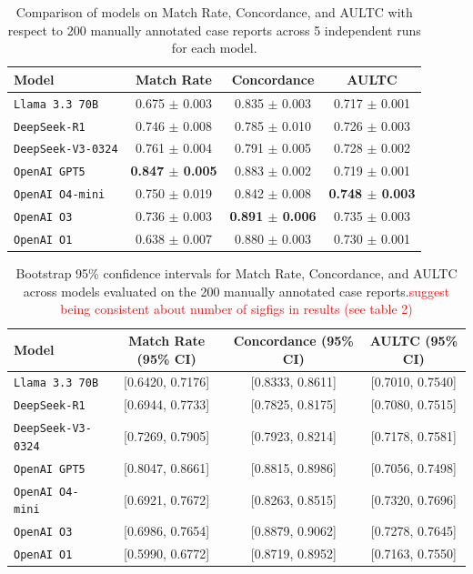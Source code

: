 \documentclass[pdflatex,sn-mathphys-num]{sn-jnl}%
\newcommand{\jeremy}[1]{\textcolor{red}{#1}}
\theoremstyle{thmstyleone}%
\theoremstyle{thmstyletwo}%
\theoremstyle{thmstylethree}%
\begin{document}
\begin{table}[h!]
\vspace{-5mm}
\centering
\caption{Comparison of models on Match Rate, Concordance, and AULTC with respect to 200 manually annotated case reports across 5 independent runs for each model.}
\label{tab:model_comparison}
\begin{tabular}{lccc}
\hline
\textbf{Model} & \textbf{Match Rate} & \textbf{Concordance} & \textbf{AULTC} \\
\hline
\texttt{Llama 3.3 70B}       & 0.675 $\pm$ 0.003 & 0.835 $\pm$ 0.003 & 0.717 $\pm$ 0.001 \\
\texttt{DeepSeek-R1}         & 0.746 $\pm$ 0.008 & 0.785 $\pm$ 0.010 & 0.726 $\pm$ 0.003 \\
\texttt{DeepSeek-V3-0324}    & 0.761 $\pm$ 0.004 & 0.791 $\pm$ 0.005 & 0.728 $\pm$ 0.002 \\
\texttt{OpenAI GPT5}         & \textbf{0.847 $\pm$ 0.005} & 0.883 $\pm$ 0.002 & 0.719 $\pm$ 0.001 \\
\texttt{OpenAI O4-mini}      & 0.750 $\pm$ 0.019 & 0.842 $\pm$ 0.008 & \textbf{0.748 $\pm$ 0.003} \\
\texttt{OpenAI O3}           & 0.736 $\pm$ 0.003 & \textbf{0.891 $\pm$ 0.006} & 0.735 $\pm$ 0.003 \\
\texttt{OpenAI O1}           & 0.638 $\pm$ 0.007 & 0.880 $\pm$ 0.003 & 0.730 $\pm$ 0.001 \\
\hline
\end{tabular}
\vspace{-7.5mm}
\end{table}

\begin{table}[ht!]
\vspace{-7.5mm}
\centering
\caption{Bootstrap 95\% confidence intervals for Match Rate, Concordance, and AULTC across models evaluated on the 200 manually annotated case reports.\jeremy{suggest being consistent about number of sigfigs in results (see table 2)}}
\label{tab:bootstrap_intervals}
\begin{tabular}{lccc}
\hline
\textbf{Model} & \textbf{Match Rate (95\% CI)} & \textbf{Concordance (95\% CI)} & \textbf{AULTC (95\% CI)} \\
\hline
\texttt{Llama 3.3 70B}      & [0.6420, 0.7176] & [0.8333, 0.8611] & [0.7010, 0.7540] \\
\texttt{DeepSeek-R1}        & [0.6944, 0.7733] & [0.7825, 0.8175] & [0.7080, 0.7515] \\
\texttt{DeepSeek-V3-0324}   & [0.7269, 0.7905] & [0.7923, 0.8214] & [0.7178, 0.7581] \\
\texttt{OpenAI GPT5}        & [0.8047, 0.8661] & [0.8815, 0.8986] & [0.7056, 0.7498] \\
\texttt{OpenAI O4-mini}     & [0.6921, 0.7672] & [0.8263, 0.8515] & [0.7320, 0.7696] \\
\texttt{OpenAI O3}          & [0.6986, 0.7654] & [0.8879, 0.9062] & [0.7278, 0.7645] \\
\texttt{OpenAI O1}          & [0.5990, 0.6772] & [0.8719, 0.8952] & [0.7163, 0.7550] \\
\hline
\end{tabular}
\vspace{-7.5mm}
\end{table}
\end{document}
